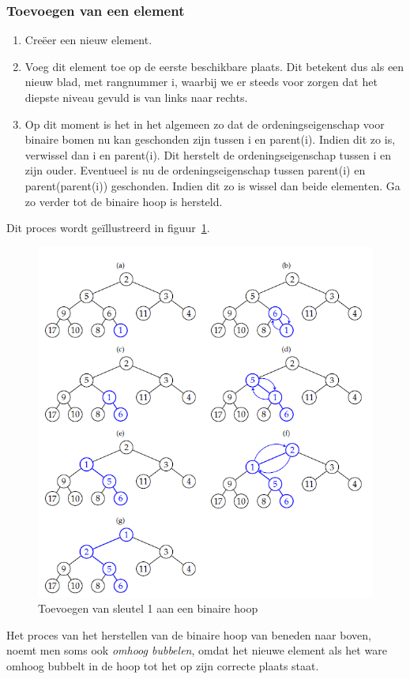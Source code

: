 \documentclass[a4paper,12pt]{article}
\begin{document}
\subsubsection{Toevoegen van een element}
\begin{enumerate}
\item Creëer een nieuw element.
\item Voeg dit element toe op de eerste beschikbare plaats.
Dit betekent dus als een nieuw blad, met rangnummer i, waarbij we er steeds voor zorgen dat het diepste niveau gevuld is van links naar rechts.
\item Op dit moment is het in het algemeen zo dat de ordeningseigenschap voor binaire bomen nu kan geschonden zijn tussen i en parent(i).
Indien dit zo is, verwissel dan i en parent(i). Dit herstelt de ordeningseigenschap tussen i en zijn ouder.
Eventueel is nu de ordeningseigenschap tussen parent(i) en parent(parent(i)) geschonden.
Indien dit zo is wissel dan beide elementen.
Ga zo verder tot de binaire hoop is hersteld.
\end{enumerate}

Dit proces wordt geïllustreerd in figuur~\ref{fig:ToevoegenBinaireHoop}.

\begin{figure}[H]
	\centering
	\includegraphics[width=.5\linewidth]{img/ToevoegenBinaireHoop}
  	\caption{Toevoegen van sleutel 1 aan een binaire hoop}
  	\label{fig:ToevoegenBinaireHoop}
\end{figure}

Het proces van het herstellen van de binaire hoop van beneden
naar boven, noemt men soms ook \textit{omhoog bubbelen}, omdat het nieuwe element
als het ware omhoog bubbelt in de hoop tot het op zijn correcte plaats staat.
\end{document}
